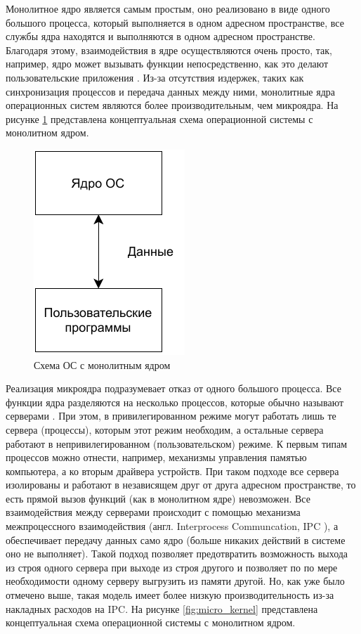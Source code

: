 Монолитное ядро является самым простым, оно реализовано в виде одного большого процесса, который выполняется в одном адресном пространстве, все службы ядра находятся и выполняются в одном адресном пространстве. Благодаря этому, взаимодействия в ядре осуществляются очень просто, так, например, ядро может вызывать функции непосредственно, как это делают пользовательские приложения \cite{kernel-development}. Из-за отсутствия издержек, таких как синхронизация процессов и передача данных между ними, монолитные ядра операционных систем являются более производительным, чем микроядра. На рисунке \ref{fig:monolithic kernel} представлена концептуальная схема операционной системы с монолитном ядром.

\begin{figure}[h]
	\centering
	\includegraphics[scale=2]{img/monolithic_kernel.pdf}
	\caption{Схема ОС с монолитным ядром}
	\label{fig:monolithic kernel}
\end{figure}
 
Реализация микроядра подразумевает отказ от одного большого процесса. Все функции ядра разделяются на несколько процессов, которые обычно называют серверами \cite{kernel-development}. При этом, в привилегированном режиме могут работать лишь те сервера (процессы), которым этот режим необходим, а остальные сервера работают в непривилегированном (пользовательском) режиме. К первым типам процессов можно отнести, например, механизмы управления памятью компьютера, а ко вторым драйвера устройств. При таком подходе все сервера изолированы и работают в независящем друг от друга адресном пространстве, то есть прямой вызов функций (как в монолитном ядре) невозможен. Все взаимодействия между серверами происходит с помощью механизма межпроцессного взаимодействия (англ. Interprocess Communcation, IPC \cite{ipc}), а обеспечивает передачу данных само ядро (больше никаких действий в системе оно не выполняет). Такой подход позволяет предотвратить возможность выхода из строя одного сервера при выходе из строя другого и позволяет по по мере необходимости одному серверу выгрузить из памяти другой. Но, как уже было отмечено выше, такая модель имеет более низкую производительность из-за накладных расходов на IPC. На рисунке \ref{fig:micro_kernel} представлена концептуальная схема операционной системы с монолитном ядром. 


